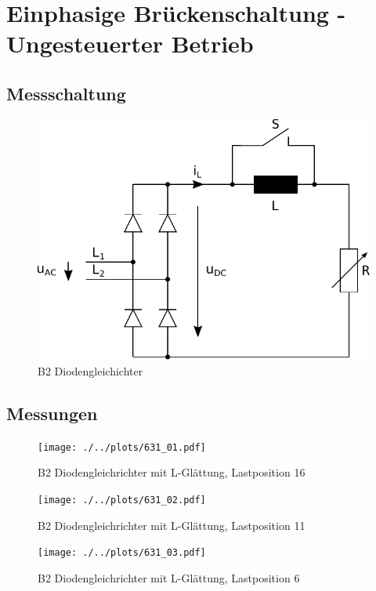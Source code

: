 \section{Einphasige Brückenschaltung - Ungesteuerter Betrieb}

\subsection{Messschaltung}

\begin{figure}[h!]
    \centering
    \includegraphics[scale=\sscale]{./../fig/b2_diode.pdf}
    \caption{B2 Diodengleichichter}
    \label{fig:b2_diode}
\end{figure}

\subsection{Messungen}

\begin{figure}[h!]
    \centering
    \texttt{[image: ./../plots/631\_01.pdf]}
    \caption{B2 Diodengleichrichter mit L-Glättung, Lastposition 16}
    \label{fig:b2_diode_l16}
\end{figure}

\begin{figure}[h!]
    \centering
    \texttt{[image: ./../plots/631\_02.pdf]}
    \caption{B2 Diodengleichrichter mit L-Glättung, Lastposition 11}
    \label{fig:b2_diode_l11}
\end{figure}

\begin{figure}[h!]
    \centering
    \texttt{[image: ./../plots/631\_03.pdf]}
    \caption{B2 Diodengleichrichter mit L-Glättung, Lastposition 6}
    \label{fig:b2_diode_l6}
\end{figure}

